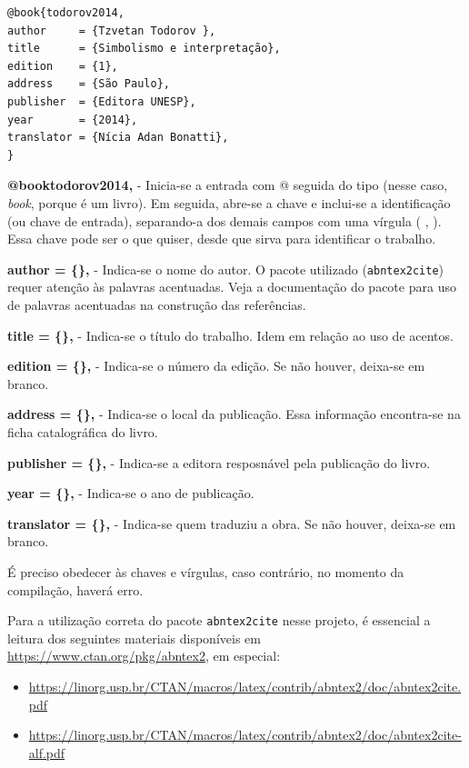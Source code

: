 \documentclass[a4paper,12pt,oneside,openright,extrafontsizes,openbib]{memoir}
\begin{document}
{\begin{multicols}{2}
\begin{verbatim}
@book{todorov2014, 
author     = {Tzvetan Todorov },
title      = {Simbolismo e interpretação},
edition    = {1},
address    = {São Paulo},
publisher  = {Editora UNESP},
year       = {2014},
translator = {Nícia Adan Bonatti},
}
\end{verbatim}
\end{multicols}


{\textbf{@book{todorov2014,}} - Inicia-se a entrada com @ seguida do tipo (nesse caso, \textit{book}, porque é um livro). Em seguida, abre-se a chave e inclui-se a identificação (ou chave de entrada), separando-a dos demais campos com uma vírgula ( , ). Essa chave pode ser o que quiser, desde que sirva para identificar o trabalho.
	
{\textbf{author     = \{\},}} - Indica-se o nome do autor. O pacote utilizado (\verb|abntex2cite|) requer atenção às palavras acentuadas. Veja a documentação do pacote para uso de palavras acentuadas na construção das referências.

{\textbf{title      = \{\},}} - Indica-se o título do trabalho. Idem em relação ao uso de acentos.

{\textbf{edition    = \{\},}} - Indica-se o número da edição. Se não houver, deixa-se em branco.

{\textbf{address    = \{\},}} - Indica-se o local da publicação. Essa informação encontra-se na ficha catalográfica do livro.

{\textbf{publisher  = \{\},}} - Indica-se a editora resposnável pela publicação do livro.

{\textbf{year       = \{\},}} - Indica-se o ano de publicação.

{\textbf{translator = \{\},}} - Indica-se quem traduziu a obra. Se não houver, deixa-se em branco.

É preciso obedecer às chaves e vírgulas, caso contrário, no momento da compilação, haverá erro.

Para a utilização correta do pacote \verb|abntex2cite| nesse projeto, é essencial a leitura dos seguintes materiais disponíveis em \url{https://www.ctan.org/pkg/abntex2}, em especial:

\begin{itemize}
    \item \url{https://linorg.usp.br/CTAN/macros/latex/contrib/abntex2/doc/abntex2cite.pdf}
    \item \url{https://linorg.usp.br/CTAN/macros/latex/contrib/abntex2/doc/abntex2cite-alf.pdf}
\end{itemize}

}}
\end{document}
